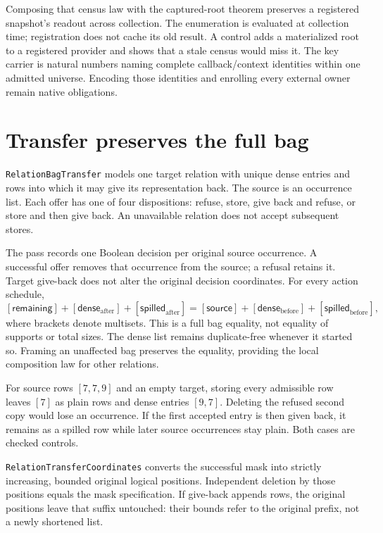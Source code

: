 \documentclass[11pt,a4paper]{article}
\newcommand{\code}[1]{\nolinkurl{#1}}
\begin{document}
Composing that census law with the captured-root theorem preserves a
registered snapshot's readout across collection. The enumeration is evaluated
at collection time; registration does not cache its old result. A control
adds a materialized root to a registered provider and shows that a stale
census would miss it. The key carrier is natural numbers naming complete
callback/context identities within one admitted universe. Encoding those
identities and enrolling every external owner remain native obligations.

\section{Transfer preserves the full bag}

\code{RelationBagTransfer} models one target relation with unique dense entries
and rows into which it may give its representation back. The source is an
occurrence list. Each offer has one of four dispositions: refuse, store,
give back and refuse, or store and then give back. An unavailable relation
does not accept subsequent stores.

The pass records one Boolean decision per original source occurrence. A
successful offer removes that occurrence from the source; a refusal retains
it. Target give-back does not alter the original decision coordinates. For
every action schedule,
\[
 [\mathsf{remaining}] + [\mathsf{dense}_{\mathrm{after}}]
   + [\mathsf{spilled}_{\mathrm{after}}]
 = [\mathsf{source}] + [\mathsf{dense}_{\mathrm{before}}]
   + [\mathsf{spilled}_{\mathrm{before}}],
\]
where brackets denote multisets. This is a full bag equality, not equality
of supports or total sizes. The dense list remains duplicate-free whenever
it started so. Framing an unaffected bag preserves the equality, providing
the local composition law for other relations.

For source rows $[7,7,9]$ and an empty target, storing every admissible row
leaves $[7]$ as plain rows and dense entries $[9,7]$. Deleting the refused
second copy would lose an occurrence. If the first accepted entry is then
given back, it remains as a spilled row while later source occurrences stay
plain. Both cases are checked controls.

\code{RelationTransferCoordinates} converts the successful mask into strictly
increasing, bounded original logical positions. Independent deletion by
those positions equals the mask specification. If give-back appends rows,
the original positions leave that suffix untouched: their bounds refer to
the original prefix, not a newly shortened list.
\end{document}
